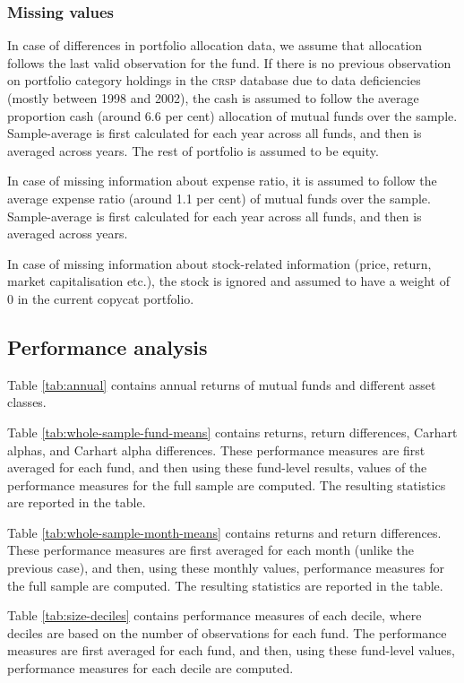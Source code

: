 \documentclass[12pt, a4]{article}
\begin{document}
\subsubsection*{Missing values}\label{sec:missing-values}
In case of differences in portfolio allocation data, we assume that allocation follows the last valid observation for the fund. If there is no previous observation on  portfolio category holdings in the \textsc{crsp} database due to data deficiencies (mostly between 1998 and 2002), the cash is assumed to follow the average proportion cash (around 6.6 per cent) allocation of mutual funds over the sample. Sample-average is first calculated for each year across all funds, and then is averaged across years. The rest of portfolio is assumed to be equity. 

In case of missing information about expense ratio, it is assumed to follow the average expense ratio (around 1.1 per cent) of mutual funds over the sample. Sample-average is first calculated for each year across all funds, and then is averaged across years.

In case of missing information about stock-related information (price, return, market capitalisation etc.), the stock is ignored and assumed to have a weight of 0 in the current copycat portfolio.

\subsection*{Performance analysis}\label{sec:performance-analysis}

Table \ref{tab:annual} contains annual returns of mutual funds and different asset classes.

Table \ref{tab:whole-sample-fund-means} contains returns, return differences, Carhart alphas, and Carhart alpha differences. These performance measures are first averaged for each fund, and then using these fund-level results, values of the performance measures for the full sample are computed. The resulting statistics are reported in the table.

Table \ref{tab:whole-sample-month-means} contains returns and return differences. These performance measures are first averaged for each month (unlike the previous case), and then, using these monthly values, performance measures for the full sample are computed. The resulting statistics are reported in the table.

Table \ref{tab:size-deciles} contains performance measures of each decile, where deciles are based on the number of observations for each fund. The performance measures are first averaged for each fund, and then, using these fund-level values, performance measures for each decile are computed.
\end{document}
